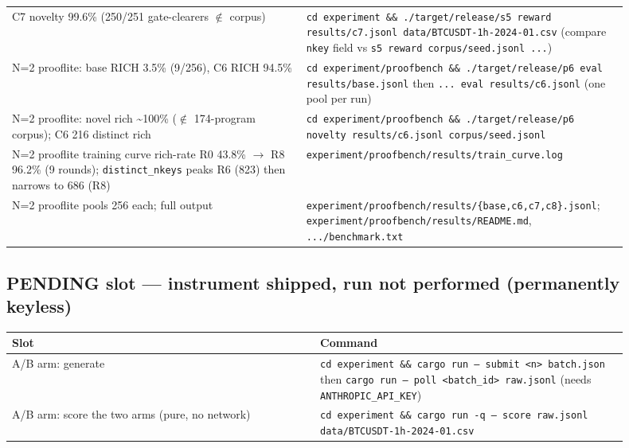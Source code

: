 \documentclass[11pt]{article}
\newcommand{\code}[1]{\texttt{#1}}
\begin{document}
\begin{longtable}{p{0.450\linewidth} p{0.450\linewidth}}
C7 novelty 99.6\% (250/251 gate-clearers $\notin$ corpus) & \code{cd experiment \&\& ./target/release/s5 reward results/c7.jsonl data/BTCUSDT-1h-2024-01.csv} (compare \code{nkey} field vs \code{s5 reward corpus/seed.jsonl ...}) \\
N=2 prooflite: base RICH 3.5\% (9/256), C6 RICH 94.5\% & \code{cd experiment/proofbench \&\& ./target/release/p6 eval results/base.jsonl} then \code{... eval results/c6.jsonl} (one pool per run) \\
N=2 prooflite: novel rich \textasciitilde{}100\% ($\notin$ 174-program corpus); C6 216 distinct rich & \code{cd experiment/proofbench \&\& ./target/release/p6 novelty results/c6.jsonl corpus/seed.jsonl} \\
N=2 prooflite training curve rich-rate R0 43.8\% $\rightarrow$ R8 96.2\% (9 rounds); \code{distinct\_nkeys} peaks R6 (823) then narrows to 686 (R8) & \code{experiment/proofbench/results/train\_curve.log} \\
N=2 prooflite pools 256 each; full output & \code{experiment/proofbench/results/\{base,c6,c7,c8\}.jsonl}; \code{experiment/proofbench/results/README.md}, \code{.../benchmark.txt} \\
\bottomrule
\end{longtable}\endgroup

\subsection*{PENDING slot --- instrument shipped, run not performed (permanently keyless)}

\begingroup\small
\begin{longtable}{p{0.450\linewidth} p{0.450\linewidth}}
\toprule
\textbf{Slot} & \textbf{Command} \\
\midrule\endhead
A/B arm: generate & \code{cd experiment \&\& cargo run -- submit <n> batch.json} then \code{cargo run -- poll <batch\_id> raw.jsonl} (needs \code{ANTHROPIC\_API\_KEY}) \\
A/B arm: score the two arms (pure, no network) & \code{cd experiment \&\& cargo run -q -- score raw.jsonl data/BTCUSDT-1h-2024-01.csv} \\
\bottomrule
\end{longtable}\endgroup
\end{document}
